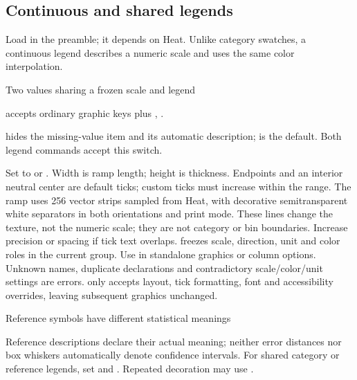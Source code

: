 \subsection{Continuous and shared legends}
Load  in the preamble; it depends on Heat. Unlike category swatches,
a continuous legend describes a numeric scale and uses the same color interpolation.
\begin{demo}{Two values sharing a frozen scale and legend}
\begingroup
{}
\par\medskip
{}
\endgroup
\end{demo}
\key{\gradheatlegend} accepts ordinary graphic keys plus ,
.\par
{} hides the missing-value item and its automatic description;
 is the default. Both legend commands accept this switch.\par
Set  to  or .
Width is ramp length; height is thickness. Endpoints and an interior neutral
center are default ticks; custom ticks must increase within the range. The ramp
uses 256 vector strips sampled from Heat, with decorative semitransparent white
separators in both orientations and print mode. These lines change the texture,
not the numeric scale; they are not category or bin boundaries.
Increase precision or spacing if tick text overlaps.
\key{\gradlegenddefine} freezes scale, direction, unit and color roles in the
current group. Use  in standalone graphics or column
options. Unknown names, duplicate declarations and contradictory scale/color/unit
settings are errors. \key{\gradlegenduse} only accepts layout, tick formatting,
font and accessibility overrides, leaving subsequent graphics unchanged.
\begin{demo}{Reference symbols have different statistical meanings}
\end{demo}
Reference descriptions declare their actual meaning; neither error distances
nor box whiskers automatically denote confidence intervals.
For shared category or reference legends, set 
and . Repeated decoration may use .


